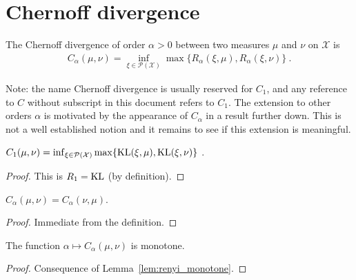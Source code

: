 \section{Chernoff divergence}

\begin{definition}
  \label{def:Chernoff}
  \leanok
    The Chernoff divergence of order $\alpha > 0$ between two measures $\mu$ and $\nu$ on $\mathcal X$ is
  \begin{align*}
    C_\alpha(\mu, \nu) = \inf_{\xi \in \mathcal P(\mathcal X)}\max\{R_\alpha(\xi, \mu), R_\alpha(\xi, \nu)\} \: .
  \end{align*}
\end{definition}

Note: the name Chernoff divergence is usually reserved for $C_1$, and any reference to $C$ without subscript in this document refers to $C_1$.
The extension to other orders $\alpha$ is motivated by the appearance of $C_\alpha$ in a result further down.
This is not a well established notion and it remains to see if this extension is meaningful.

\begin{lemma}
  \label{lem:chernoff_eq_kl}
  \leanok
  $C_1(\mu, \nu) = \inf_{\xi \in \mathcal P(\mathcal X)}\max\{\operatorname{KL}(\xi, \mu), \operatorname{KL}(\xi, \nu)\}$ .
\end{lemma}

\begin{proof}\leanok
{}
This is $R_1 = \operatorname{KL}$ (by definition).
\end{proof}

\begin{lemma}[Symmetry]
  \label{lem:chernoff_symm}
  $C_\alpha(\mu, \nu) = C_\alpha(\nu, \mu)$.
\end{lemma}

\begin{proof}%
Immediate from the definition.
\end{proof}

\begin{lemma}[Monotonicity]
  \label{lem:chernoff_mono}
  The function $\alpha \mapsto C_\alpha(\mu, \nu)$ is monotone.
\end{lemma}

\begin{proof}
Consequence of Lemma~\ref{lem:renyi_monotone}.
\end{proof}

